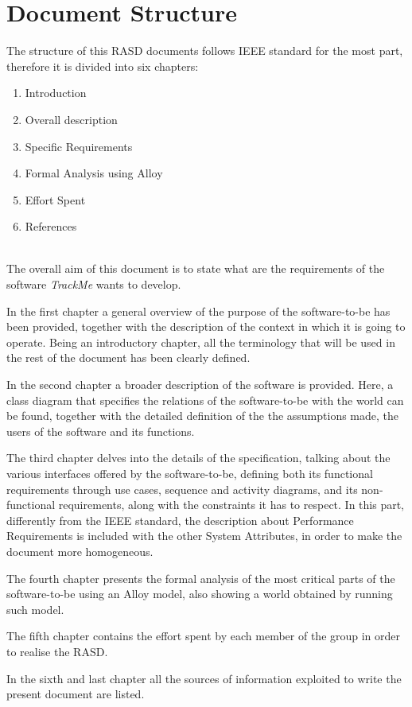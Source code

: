 \section{Document Structure}
    The structure of this RASD documents follows IEEE standard for the most part, therefore it is divided into six chapters:
    \begin{enumerate}
        \item Introduction
        
        \item Overall description
        
        \item Specific Requirements
        
        \item Formal Analysis using Alloy
        
        \item Effort Spent
        
        \item References
    \end{enumerate}
    \\
    The overall aim of this document is to state what are the requirements of the software \emph{TrackMe} wants to develop.
    
    In the first chapter a general overview of the purpose of the software-to-be has been provided, together with the description of the context in which it is going to operate. Being an introductory chapter, all the terminology that will be used in the rest of the document has been clearly defined.
    
    In the second chapter a broader description of the software is provided. Here, a class diagram that specifies the relations of the software-to-be with the world can be found, together with the detailed definition of the the assumptions made, the users of the software and its functions.
    
    The third chapter delves into the details of the specification, talking about the various interfaces offered by the software-to-be, defining both its functional requirements through use cases, sequence and activity diagrams, and its non-functional requirements, along with the constraints it has to respect. In this part, differently from the IEEE standard, the description about Performance Requirements is included with the other System Attributes, in order to make the document more homogeneous.
    
    The fourth chapter presents the formal analysis of the most critical parts of the software-to-be using an Alloy model, also showing a world obtained by running such model.
    
    The fifth chapter contains the effort spent by each member of the group in order to realise the RASD.
    
    In the sixth and last chapter all the sources of information exploited to write the present document are listed.
